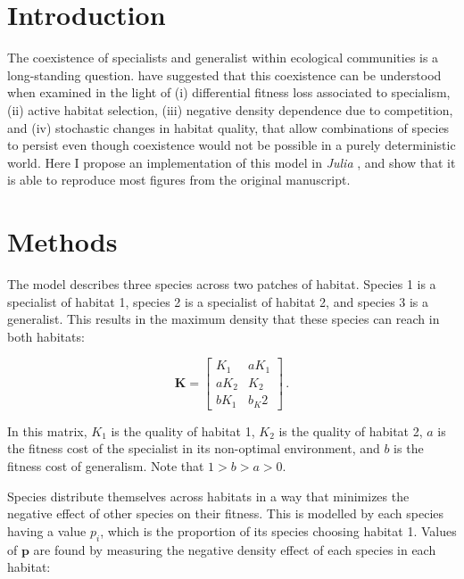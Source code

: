 \documentclass[10pt,a4paper,onecolumn]{article}
\begin{document}
\section{Introduction}\label{introduction}

The coexistence of specialists and generalist within ecological
communities is a long-standing question. \textcite{wils94csg} have
suggested that this coexistence can be understood when examined in the
light of (i) differential fitness loss associated to specialism, (ii)
active habitat selection, (iii) negative density dependence due to
competition, and (iv) stochastic changes in habitat quality, that allow
combinations of species to persist even though coexistence would not be
possible in a purely deterministic world. Here I propose an
implementation of this model in \emph{Julia} \autocite{beza17jfa}, and
show that it is able to reproduce most figures from the original
manuscript.

\section{Methods}\label{methods}

The \textcite{wils94csg} model describes three species across two
patches of habitat. Species 1 is a specialist of habitat 1, species 2 is
a specialist of habitat 2, and species 3 is a generalist. This results
in the maximum density that these species can reach in both habitats:

\begin{equation}
\mathbf{K} = \begin{bmatrix}
  K_1 & aK_1 \\
  aK_2 & K_2 \\
  bK_1 & b_K2
\end{bmatrix} \,.
\end{equation}

In this matrix, \(K_1\) is the quality of habitat 1, \(K_2\) is the
quality of habitat 2, \(a\) is the fitness cost of the specialist in its
non-optimal environment, and \(b\) is the fitness cost of generalism.
Note that \(1 > b > a > 0\).

Species distribute themselves across habitats in a way that minimizes
the negative effect of other species on their fitness. This is modelled
by each species having a value \(p_i\), which is the proportion of its
species choosing habitat 1. Values of \(\mathbf{p}\) are found by
measuring the negative density effect of each species in each habitat:
\end{document}
